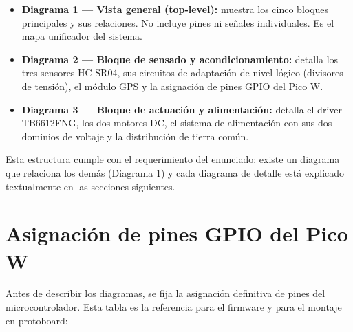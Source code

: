 \documentclass[12pt]{report}
\begin{document}
\begin{itemize}
    \item \textbf{Diagrama 1 — Vista general (top-level):} muestra los cinco bloques principales y sus relaciones. No incluye pines ni señales individuales. Es el mapa unificador del sistema.
    \item \textbf{Diagrama 2 — Bloque de sensado y acondicionamiento:} detalla los tres sensores HC-SR04, sus circuitos de adaptación de nivel lógico (divisores de tensión), el módulo GPS y la asignación de pines GPIO del Pico W.
    \item \textbf{Diagrama 3 — Bloque de actuación y alimentación:} detalla el driver TB6612FNG, los dos motores DC, el sistema de alimentación con sus dos dominios de voltaje y la distribución de tierra común.
\end{itemize}

Esta estructura cumple con el requerimiento del enunciado: existe un diagrama que relaciona los demás (Diagrama 1) y cada diagrama de detalle está explicado textualmente en las secciones siguientes.

\section{Asignación de pines GPIO del Pico W}

Antes de describir los diagramas, se fija la asignación definitiva de pines del microcontrolador. Esta tabla es la referencia para el firmware y para el montaje en protoboard:
\end{document}
